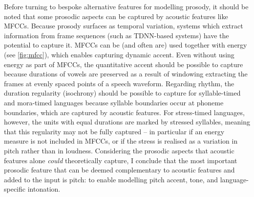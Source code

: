 \documentclass[bsc,frontabs,twoside,singlespacing,parskip,deptreport]{infthesis}
\begin{document}
{{{      %
      Before turning to bespoke alternative features for modelling prosody, it should be noted that some prosodic aspects can be captured by acoustic features like MFCCs. Because prosody surfaces as temporal variation, systems which extract information from frame sequences (such as TDNN-based systems) have the potential to capture it. MFCCs can be (and often are) used together with energy (see \autoref{fig:mfcc}), which enables capturing dynamic accent. Even without using energy as part of MFCCs, the quantitative accent should be possible to capture because durations of vowels are preserved as a result of windowing extracting the frames at evenly spaced points of a speech waveform. Regarding rhythm, the duration regularity (isochrony) should be possible to capture for syllable-timed and mora-timed languages because syllable boundaries occur at phoneme boundaries, which are captured by acoustic features. For stress-timed languages, however, the units with equal durations are marked by stressed syllables, meaning that this regularity may not be fully captured -- in particular if an energy measure is not included in MFCCs, or if the stress is realised as a variation in pitch rather than in loudness. Considering the prosodic aspects that acoustic features alone \textit{could} theoretically capture, I conclude that the most important prosodic feature that can be deemed complementary to acoustic features and added to the input is pitch: to enable modelling pitch accent, tone, and language-specific intonation.


}}}
\end{document}

